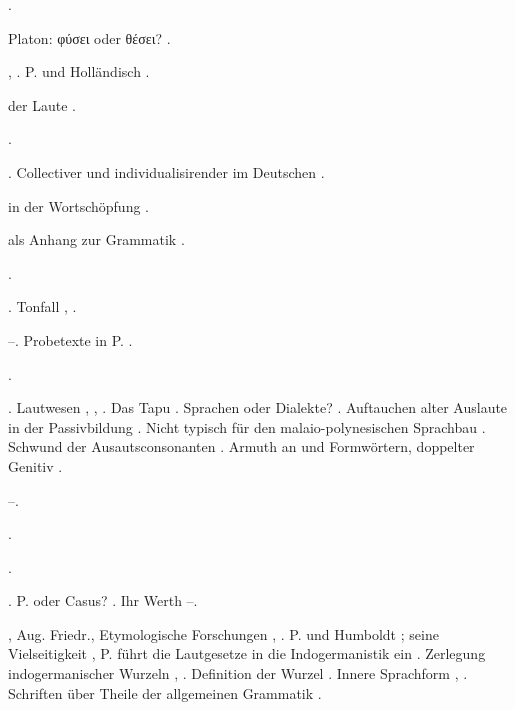 \begin{register}
 \pageref{sp.435}.

Platon: φύσει oder θέσει? \pageref{sp.179}.

 \pageref{sp.55}, \pageref{sp.57}. P. und Holländisch \pageref{sp.159}.

 der Laute \pageref{sp.200}.


 \pageref{sp.265}.

 \pageref{sp.101}. Collectiver und individualisirender im Deutschen \pageref{sp.254}.

 in der Wortschöpfung \pageref{sp.42}.

 als Anhang zur Grammatik \pageref{sp.107}.

 \pageref{sp.177}.

. Tonfall \pageref{sp.34}, \pageref{sp.431}. 

 \pageref{sp.27}–\pageref{sp.28}. Probetexte in P. \pageref{sp.106}.

 \pageref{sp.147}.

. Lautwesen \pageref{sp.34}, \pageref{sp.149}, \pageref{sp.197}. Das Tapu \fed{\pageref{fp.46},} \pageref{sp.245}. Sprachen oder Dialekte? \pageref{sp.54}. Auftauchen alter Auslaute in der Passivbildung \pageref{sp.87}. Nicht typisch für den malaio-polynesischen Sprachbau \pageref{sp.415}. Schwund der Aus\pageref{sp.1}autsconsonanten \pageref{sp.435}. Armuth an  und Formwörtern, doppelter Genitiv \pageref{sp.463}.

 \pageref{sp.354}–\pageref{sp.359}. 

 \pageref{sp.265}.

 \pageref{sp.54}.




 \pageref{sp.101}. P. oder Casus? \pageref{sp.115}. Ihr Werth \pageref{sp.461}–\pageref{sp.463}.

, Aug. Friedr., Etymologische Forschungen \pageref{sp.27}, \sed{\pageref{sp.176},} \pageref{sp.293}. P. und Humboldt \pageref{sp.29}\sed{, \pageref{sp.137}}; seine Vielseitigkeit \pageref{sp.30},  P. führt die Lautgesetze in die Indogermanistik ein \pageref{sp.170}. Zerlegung indogermanischer Wurzeln \pageref{sp.180}, \pageref{sp.242}.  Definition der Wurzel \pageref{sp.296}. Innere Sprachform \pageref{sp.327}, \pageref{sp.334}. Schriften über Theile der allgemeinen Grammatik \pageref{sp.481}.


\end{register}
